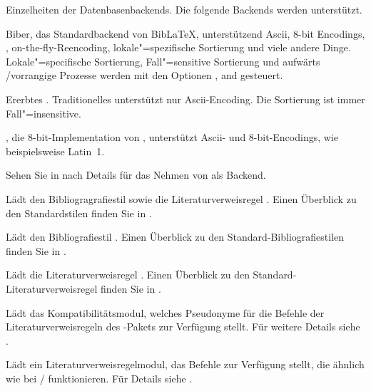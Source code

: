 \documentclass{ltxdockit}[2011/03/25]
\newcommand*{\biber}{Biber\xspace}
\newcommand*{\biblatex}{BibLaTeX\xspace}
\begin{document}
\begin{optionlist}


Einzelheiten der Datenbasenbackends. Die folgende Backends werden unterstützt. 

\begin{valuelist}

\item[biber] \biber, das Standardbackend von \biblatex, unterstützend Ascii, 8-bit Encodings, \utf, on-the-fly-Reencoding, lokale"=spezifische Sortierung und viele andere
Dinge. Lokale"=specifische Sortierung, Fall"=sensitive Sortierung und 
aufwärts \slash vorrangige Prozesse werden mit den Optionen ,  and  gesteuert.

\item[bibtex] Ererbtes \bibtex. Traditionelles \bibtex unterstützt nur Ascii-Enco\-ding.  Die Sortierung ist immer Fall"=insensitive.

\item[bibtex8] , die 8-bit-Implementation von \bibtex, unterstützt
Ascii- und 8-bit-Encodings, wie beispielsweise Latin~1. 

\end{valuelist}

Sehen Sie in  nach Details für das Nehmen von \bibtex als Backend. 


Lädt den Bibliogragrafiestil  sowie die Literaturverweisregel
. Einen Überblick zu den Standardstilen finden Sie in
.


Lädt den Bibliografiestil . Einen Überblick zu den
Standard-Bibliografiestilen finden Sie in .


Lädt die Literaturverweisregel . Einen Überblick zu den
Standard-Literatur\-verweisregel finden Sie in .


Lädt das Kompatibilitätsmodul, welches Pseudonyme für die Befehle der
Literaturverweisregeln des -Pakets zur Verfügung stellt. Für weitere
Details siehe .


Lädt ein Literaturverweisregelmodul, das Befehle zur Verfügung stellt, die
ähnlich wie bei \slash{} funktionieren. Für Details
siehe .

\end{optionlist}
\end{document}
